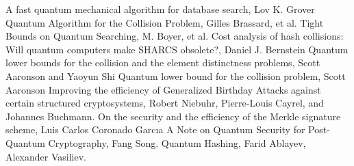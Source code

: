 \documentclass[10pt,a4paper]{article}
\begin{document}
\begin{thebibliography}{40}
 A fast quantum mechanical algorithm for database search, Lov K. Grover
 Quantum Algorithm for the Collision Problem, Gilles Brassard, et al.
 Tight Bounds on Quantum Searching, M. Boyer, et al.
 Cost analysis of hash collisions: Will quantum computers make SHARCS obsolete?, Daniel J. Bernstein
 Quantum lower bounds for the collision and the element distinctness problems, Scott Aaronson and Yaoyun Shi
 Quantum lower bound for the collision problem, Scott Aaronson
 Improving the efficiency of Generalized Birthday Attacks against certain structured cryptosystems, Robert Niebuhr, Pierre-Louis Cayrel, and Johannes Buchmann.
 On the security and the efficiency of the Merkle signature scheme, Luis Carlos Coronado Garcıa 
A Note on Quantum Security for Post-Quantum Cryptography, Fang Song.
  Quantum Hashing, Farid Ablayev, Alexander Vasiliev.
\end{thebibliography}
\end{document}
